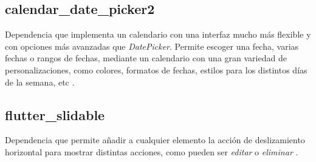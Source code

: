 \subsection{calendar\_date\_picker2}
Dependencia que implementa un calendario con una interfaz mucho más flexible y con opciones más avanzadas que \textit{DatePicker}. Permite escoger una fecha, varias fechas o rangos de fechas, mediante un calendario con una gran variedad de personalizaciones, como colores, formatos de fechas, estilos para los distintos días de la semana, etc \cite{calendar}.
\subsection{flutter\_slidable}
Dependencia que permite añadir a cualquier elemento la acción de deslizamiento horizontal para mostrar distintas acciones, como pueden ser \textit{editar} o \textit{eliminar} \cite{slidable}.